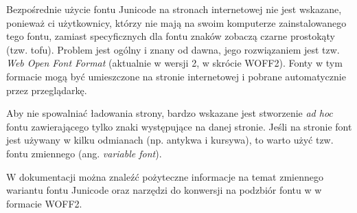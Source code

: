 Bezpośrednie użycie fontu Junicode na stronach internetowej nie jest
wskazane, ponieważ ci użytkownicy, którzy nie mają na swoim komputerze
zainstalowanego tego fontu, zamiast specyficznych dla fontu znaków
zobaczą czarne prostokąty (tzw. tofu). Problem jest ogólny i znany od
dawna, jego rozwiązaniem jest tzw. \textit{ Web Open Font Format}
(aktualnie w wersji 2, w skrócie WOFF2). Fonty w tym formacie mogą być umieszczone na
stronie internetowej i pobrane automatycznie przez przeglądarkę.

Aby nie spowalniać ładowania strony, bardzo wskazane jest stworzenie
\textit{ad hoc} fontu zawierającego tylko znaki występujące na danej
stronie. Jeśli na stronie font jest używany w kilku odmianach
(np. antykwa i kursywa), to warto użyć tzw. fontu zmiennego
(ang. \textit{variable font}).

W dokumentacji \autocite{baker22:Junicode} można znaleźć pożyteczne
informacje na temat zmiennego wariantu fontu Junicode oraz narzędzi do
konwersji na podzbiór fontu w w formacie WOFF2.






\printbibliography




